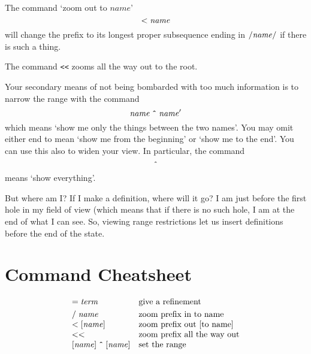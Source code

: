 \documentclass{article}
\begin{document}
The command `zoom out to $\mathit{name}$'
\[
{\tt <}\;\mathit{name}
\]
will change the prefix to its longest proper subsequence ending in
${\tt /}\mathit{name}{\tt /}$
if there is such a thing.

The command {\tt <<} zooms all the way out to the root.

Your secondary means of not being bombarded with too much information is to narrow
the range with the command
\[
\mathit{name}\;\mbox{\tt \^{}}\;\mathit{name}'
\]
which means `show me only the things between the two names'. You may omit either end
to mean `show me from the beginning' or `show me to the end'. You can use this also to
widen your view. In particular, the command
\[
\mbox{\tt \^{}}
\]
means `show everything'.

But where am I? If I make a definition, where will it go? I am just before
the first hole in my field of view (which means that if there is no such hole, I am at the
end of what I can see. So, viewing range restrictions let us insert definitions
before the end of the state.



\newpage\appendix

\section{Command Cheatsheet}

\[\begin{array}{ll}
{\tt =}\;\mathit{term} & \mbox{give a refinement} \smallskip\\

{\tt /}\;\mathit{name} & \mbox{zoom prefix in to name}\\
{\tt <}\;[\mathit{name}] & \mbox{zoom prefix out [to name]}\\
{\tt <<} & \mbox{zoom prefix all the way out}\\
{}[\mathit{name}]\;\mbox{\tt \^{}}\;[\mathit{name}] & \mbox{set the range}\\
\end{array}\]
\end{document}
